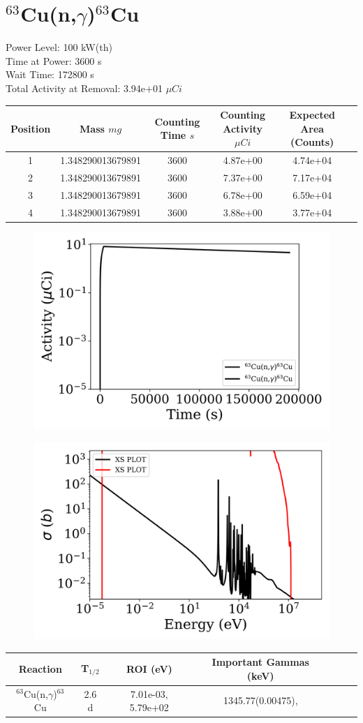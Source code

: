 \newpage

\section*{ $^{63}$Cu(n,$\gamma$)$^{63}$Cu }

Power Level: 100 kW(th) \\
Time at Power: 3600 s \\
Wait Time: 172800 s \\
Total Activity at Removal: 3.94e+01 $\mu Ci$

\begin{table}[h]
\centering
\begin{tabular}{ |c|c|c|c|c|c| }
 \hline
 Position & Mass $mg$ & Counting Time $s$ & Counting Activity $\mu Ci$ & Expected Area (Counts) \\
 \hline 
 1 & 1.348290013679891 & 3600 & 4.87e+00 & 4.74e+04\\ 
\hline
 2 & 1.348290013679891 & 3600 & 7.37e+00 & 7.17e+04\\ 
\hline
 3 & 1.348290013679891 & 3600 & 6.78e+00 & 6.59e+04\\ 
\hline
 4 & 1.348290013679891 & 3600 & 3.88e+00 & 3.77e+04\\ 
\hline
\end{tabular}
\end{table}

\begin{figure}[!ht]
   \centering
   \includegraphics[width=.4\textwidth]{source/plot/Cu-63(n,gamma)Cu-64_wisconsin1.png} 

\end{figure}

\begin{figure}[!ht]
   \centering
   \includegraphics[width=.4\textwidth]{source/plot/Cu-63(n,gamma)Cu-64.png} 

\end{figure}

\begin{table}[h]
\centering
\begin{tabular}{ |c|c|c|c|c|c|c| }
 \hline
 Reaction & T$_{1/2}$ & ROI (eV) & Important Gammas (keV) \\
 \hline 
 $^{63}$Cu(n,$\gamma$)$^{63}$Cu &  2.6 d & 7.01e-03, 5.79e+02 & 1345.77(0.00475),  \\ 
\hline
\end{tabular}
\end{table}
